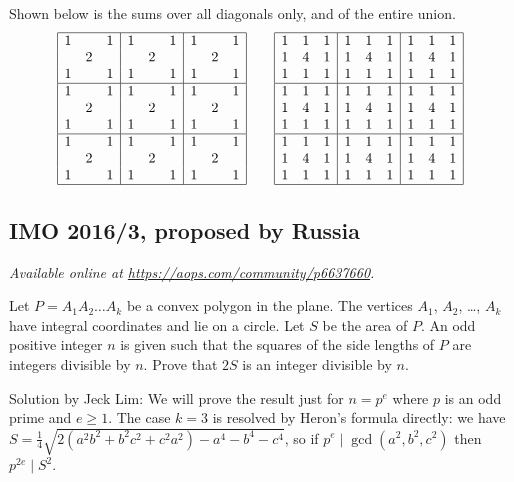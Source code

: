 \documentclass[11pt]{scrartcl}
\begin{document}
Shown below is the sums over all diagonals only,
and of the entire union.
\[
 \begin{array}{|ccc|ccc|ccc|} \hline
  1 &   & 1 & 1 &   & 1 & 1 &   & 1 \\
  & 2 &   &   & 2 &   &   & 2 &   \\
  1 &   & 1 & 1 &   & 1 & 1 &   & 1 \\\hline
  1 &   & 1 & 1 &   & 1 & 1 &   & 1 \\
  & 2 &   &   & 2 &   &   & 2 &   \\
  1 &   & 1 & 1 &   & 1 & 1 &   & 1 \\\hline
  1 &   & 1 & 1 &   & 1 & 1 &   & 1 \\
  & 2 &   &   & 2 &   &   & 2 &   \\
  1 &   & 1 & 1 &   & 1 & 1 &   & 1 \\\hline
 \end{array}
 \qquad
 \begin{array}{|ccc|ccc|ccc|} \hline
    1 & 1 & 1 & 1 & 1 & 1 & 1 & 1 & 1 \\
    1 & 4 & 1 & 1 & 4 & 1 & 1 & 4 & 1 \\
    1 & 1 & 1 & 1 & 1 & 1 & 1 & 1 & 1 \\\hline
    1 & 1 & 1 & 1 & 1 & 1 & 1 & 1 & 1 \\
    1 & 4 & 1 & 1 & 4 & 1 & 1 & 4 & 1 \\
    1 & 1 & 1 & 1 & 1 & 1 & 1 & 1 & 1 \\\hline
    1 & 1 & 1 & 1 & 1 & 1 & 1 & 1 & 1 \\
    1 & 4 & 1 & 1 & 4 & 1 & 1 & 4 & 1 \\
    1 & 1 & 1 & 1 & 1 & 1 & 1 & 1 & 1 \\\hline
 \end{array}
\]
\pagebreak

\subsection{IMO 2016/3, proposed by Russia}
\textsl{Available online at \url{https://aops.com/community/p6637660}.}
\begin{mdframed}[style=mdpurplebox,frametitle={Problem statement}]
Let $P=A_1A_2\dots A_k$ be a convex polygon in the plane.
The vertices $A_1$, $A_2$, \dots, $A_k$ have integral coordinates
and lie on a circle. Let $S$ be the area of $P$.
An odd positive integer $n$ is given such that
the squares of the side lengths of $P$ are integers divisible by $n$.
Prove that $2S$ is an integer divisible by $n$.
\end{mdframed}
Solution by Jeck Lim:
We will prove the result just for $n = p^e$
where $p$ is an odd prime and $e \ge 1$.
The case $k=3$ is resolved by Heron's formula directly:
we have $S = \frac14\sqrt{2(a^2b^2 + b^2c^2 + c^2a^2) - a^4-b^4-c^4}$,
so if $p^e \mid \gcd(a^2,b^2,c^2)$ then $p^{2e} \mid S^2$.
\end{document}
